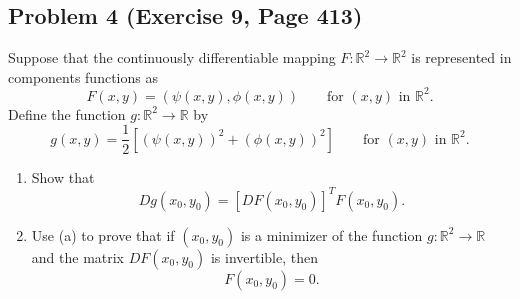 \documentclass{article}
\begin{document}
\subsection*{Problem 4 (Exercise 9, Page 413)}
Suppose that the continuously differentiable mapping $F \colon \mathbb{R}^2 \to \mathbb{R}^2$ is represented in components functions as 
\[ F(x, y) = (\psi(x, y), \phi(x, y)) \qquad \text{for $(x, y)$ in $\mathbb{R}^2$}.\]
Define the function $g\colon \mathbb{R}^2 \to \mathbb{R}$ by
\[ g(x, y) = \frac{1}{2}[(\psi(x, y))^2 + (\phi(x, y))^2] \qquad \text{for $(x, y)$ in $\mathbb{R}^2$}.\]
\begin{enumerate}[label=\alph*.]
\item Show that 
\[ Dg(x_0, y_0) = [DF(x_0, y_0)]^TF(x_0, y_0).\]
\item Use (a) to prove that if $(x_0, y_0)$ is a minimizer of the function $g \colon \mathbb{R}^2 \to \mathbb{R}$ and the matrix $DF(x_0, y_0)$ is invertible, then
\[ F(x_0, y_0) = 0.\]
\end{enumerate}
\end{document}
